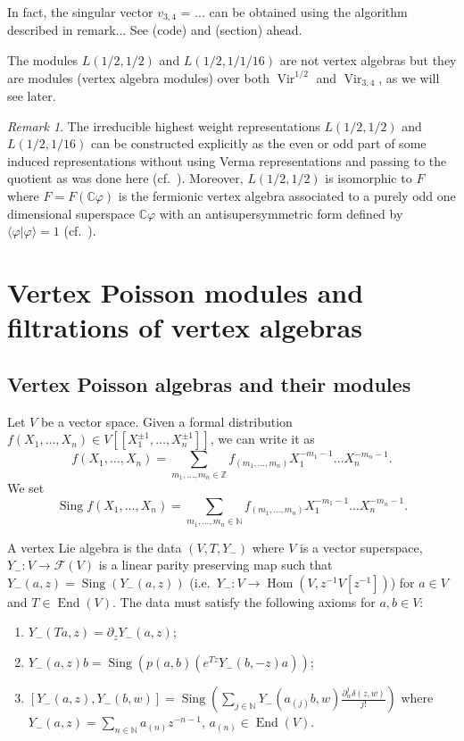 \documentclass[a4paper, 12pt, reqno]{amsart}
\theoremstyle{remark}
\newtheorem{remark}[theorem]{Remark}
\numberwithin{equation}{subsection}
\DeclareMathOperator{\Vir}{Vir}
\DeclareMathOperator{\End}{End}
\DeclareMathOperator{\one}{\overline{1}}
\DeclareMathOperator{\Hom}{Hom}
\DeclareMathOperator{\Sing}{Sing}
\begin{document}
In fact, the singular vector $v_{3, 4}$ = ... can be obtained using the algorithm described in remark... See (code) and (section) ahead.

The modules $L(1/2, 1/2)$ and $L(1/2, 1/1/16)$ are not vertex algebras but they are modules (vertex algebra modules) over both $\Vir^{1/2}$ and $\Vir_{3, 4}$, as we will see later.

\begin{remark}
  \label{rmk:25}
  The irreducible highest weight representations $L(1/2, 1/2)$ and $L(1/2, 1/16)$ can be constructed explicitly as the even or odd part of some induced representations without using Verma representations and passing to the quotient as was done here (cf.\ \cite[\S3]{kac_bombay_2013}).
  Moreover, $L(1/2, 1/2)$ is isomorphic to $F_{\one}$ where $F = F(\mathbb{C}\varphi)$ is the fermionic vertex algebra associated to a purely odd one dimensional superspace $\mathbb{C}\varphi$ with an antisupersymmetric form defined by $\langle \varphi| \varphi\rangle = 1$ (cf.\ ).
\end{remark}

\section{Vertex Poisson modules and filtrations of vertex algebras}
\label{sec:vert-poiss-modul}

\subsection{Vertex Poisson algebras and their modules}
\label{sec:vert-poiss-algebr}

Let $V$ be a vector space.
Given a formal distribution $f(X_1, \dots, X_n) \in V[[X_1^{\pm 1}, \dots, X_n^{\pm 1}]]$, we can write it as
\begin{equation*}
  f(X_1, \dots, X_n) = \sum_{m_1, \dots, m_n \in \mathbb{Z}}f_{(m_1, \dots, m_n)}X_1^{-m_1 - 1}\dots X_n^{-m_n - 1}.
\end{equation*}
We set
\begin{equation*}
  \Sing f(X_1, \dots, X_n) = \sum_{m_1, \dots, m_n \in \mathbb{N}}f_{(m_1, \dots, m_n)}X_1^{-m_1 - 1}\dots X_n^{-m_n - 1}.
\end{equation*}

A vertex Lie algebra is the data $(V, T, Y_-)$ where $V$ is a vector superspace, $Y_-: V \to \mathcal{F}(V)$ is a linear parity preserving map such that $Y_-(a,z) = \Sing(Y_-(a, z))$ (i.e.\ $Y_-: V \to \Hom(V, z^{-1}V[z^{-1}])$) for $a\in V$ and $T \in \End(V)$.
The data must satisfy the following axioms for $a, b \in V$:
\begin{enumerate}
\item $Y_-(Ta, z) = \partial_zY_-(a, z)$;
\item $Y_-(a, z)b = \Sing(p(a, b)(e^{Tz}Y_-(b, -z)a))$;
\item $[Y_-(a, z),Y_-(b, w)] = \Sing(\sum_{j \in \mathbb{N}}Y_-(a_{(j)}b, w)\frac{\partial^j_w\delta(z, w)}{j!})$ where $Y_-(a, z) = \sum_{n \in \mathbb{N}}a_{(n)}z^{-n - 1}$, $a_{(n)} \in \End(V)$.
\end{enumerate}
\end{document}
